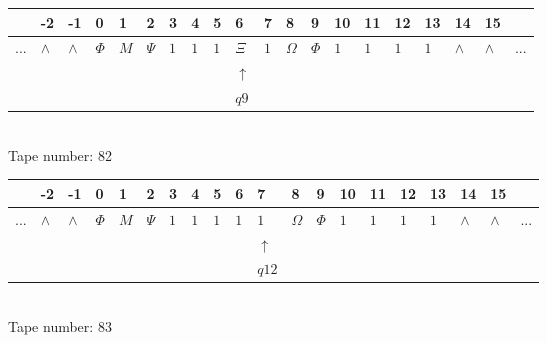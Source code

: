 \documentclass[11pt]{article}
\begin{document}
\begin{table}[H]
\centering
\begin{tabular}{llllllllllllllllllll}
 & -2 & -1 & 0 & 1 & 2 & 3 & 4 & 5 & 6 & 7 & 8 & 9 & 10 & 11 & 12 & 13 & 14 & 15 & \\
\hline
$...$ & \multicolumn{1}{|l|}{$\wedge$} & \multicolumn{1}{|l|}{$\wedge$} & \multicolumn{1}{|l|}{$\Phi$} & \multicolumn{1}{|l|}{$M$} & \multicolumn{1}{|l|}{$\Psi$} & \multicolumn{1}{|l|}{$1$} & \multicolumn{1}{|l|}{$1$} & \multicolumn{1}{|l|}{$1$} & \multicolumn{1}{|l|}{$\Xi$} & \multicolumn{1}{|l|}{$1$} & \multicolumn{1}{|l|}{$\Omega$} & \multicolumn{1}{|l|}{$\Phi$} & \multicolumn{1}{|l|}{$1$} & \multicolumn{1}{|l|}{$1$} & \multicolumn{1}{|l|}{$1$} & \multicolumn{1}{|l|}{$1$} & \multicolumn{1}{|l|}{$\wedge$} & \multicolumn{1}{|l|}{$\wedge$} & $...$\\
\hline
&  &  &  &  &  &  &  &  & $\uparrow$ &  &  &  &  &  &  &  &  &  &  \\
&  &  &  &  &  &  &  &  & $ q9 $ &  &  &  &  &  &  &  &  &  &  \\
\end{tabular}
\\
Tape number: 82
\noindent\makebox[\linewidth]{\hdashrule{\textwidth}{1pt}{1pt}}\end{table}

\begin{table}[H]
\centering
\begin{tabular}{llllllllllllllllllll}
 & -2 & -1 & 0 & 1 & 2 & 3 & 4 & 5 & 6 & 7 & 8 & 9 & 10 & 11 & 12 & 13 & 14 & 15 & \\
\hline
$...$ & \multicolumn{1}{|l|}{$\wedge$} & \multicolumn{1}{|l|}{$\wedge$} & \multicolumn{1}{|l|}{$\Phi$} & \multicolumn{1}{|l|}{$M$} & \multicolumn{1}{|l|}{$\Psi$} & \multicolumn{1}{|l|}{$1$} & \multicolumn{1}{|l|}{$1$} & \multicolumn{1}{|l|}{$1$} & \multicolumn{1}{|l|}{$1$} & \multicolumn{1}{|l|}{$1$} & \multicolumn{1}{|l|}{$\Omega$} & \multicolumn{1}{|l|}{$\Phi$} & \multicolumn{1}{|l|}{$1$} & \multicolumn{1}{|l|}{$1$} & \multicolumn{1}{|l|}{$1$} & \multicolumn{1}{|l|}{$1$} & \multicolumn{1}{|l|}{$\wedge$} & \multicolumn{1}{|l|}{$\wedge$} & $...$\\
\hline
&  &  &  &  &  &  &  &  &  & $\uparrow$ &  &  &  &  &  &  &  &  &  \\
&  &  &  &  &  &  &  &  &  & $ q12 $ &  &  &  &  &  &  &  &  &  \\
\end{tabular}
\\
Tape number: 83
\noindent\makebox[\linewidth]{\hdashrule{\textwidth}{1pt}{1pt}}\end{table}
\clearpage
\end{document}
